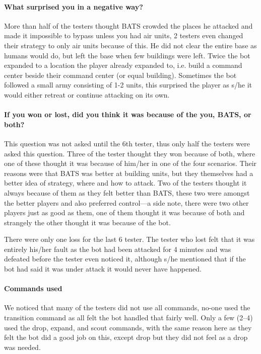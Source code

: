 \paragraph{What surprised you in a negative way?}
More than half of the testers thought BATS crowded the places he attacked and made it impossible to bypass unless you had air units, 2 testers even changed their strategy to only air units because of this. He did not clear the entire base as humans would do, but left the base when few buildings were left. Twice the bot expanded to a location the player already expanded to, i.e. build a command center beside their command center (or equal building). Sometimes the bot followed a small army consisting of 1-2 units, this surprised the player as s/he it would either retreat or continue attacking on its own.

\paragraph{If you won or lost, did you think it was because of the you, BATS, or both?}
This question was not asked until the 6th tester, thus only half the testers were asked this question. Three of the tester thought they won because of both, where one of these thought it was because of him/her in one of the four scenarios. Their reasons were that BATS was better at building units, but they themselves had a better idea of strategy, where and how to attack. Two of the testers thought it always because of them as they felt better than BATS, these two were amongst the better players and also preferred control—a side note, there were two other players just as good as them, one of them thought it was because of both and strangely the other thought it was because of the bot.

There were only one loss for the last 6 tester. The tester who lost felt that it was entirely his/her fault as the bot had been attacked for 4 minutes and was defeated before the tester even noticed it, although s/he mentioned that if the bot had said it was under attack it would never have happened.

\paragraph{Commands used}
We noticed that many of the testers did not use all commands, no-one used the transition command as all felt the bot handled that fairly well. Only a few (2–4) used the drop, expand, and scout commands, with the same reason here as they felt the bot did a good job on this, except drop but they did not feel as a drop was needed.

